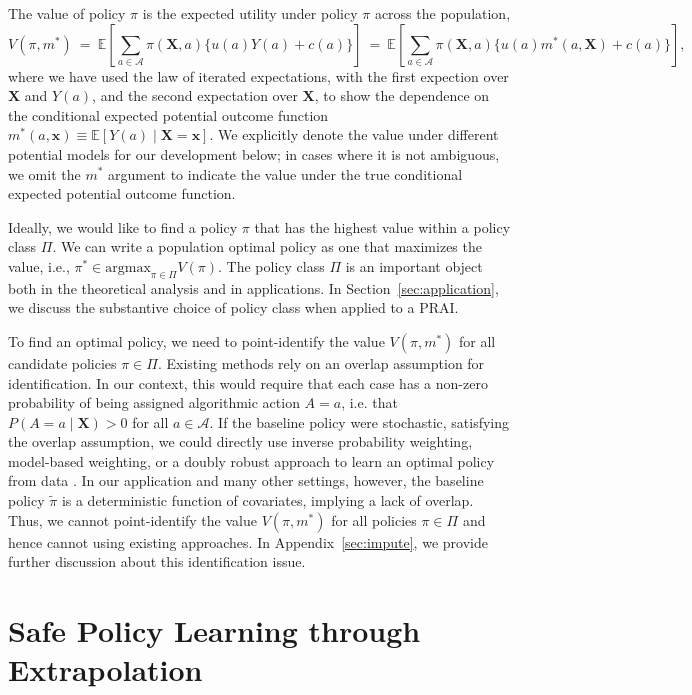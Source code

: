 \documentclass[12pt]{article}
\theoremstyle{definition}
\newcommand{\E}{\ensuremath{\mathbb{E}}}
\newcommand{\argmax}{\text{argmax}}
\newcommand{\bX}{\bm X}
\newcommand{\bx}{\bm x}
\newcommand{\<}{\langle}
\renewcommand{\>}{\rangle}
\begin{document}
The value of policy $\pi$ is the expected utility under policy $\pi$
across the population,
\begin{equation}
  \label{eq:policy_model}
  V(\pi, m^\ast) \ = \ \E\left[\sum_{a \in \mathcal{A}}\pi(\bX, a)
      \{u(a) Y(a) + c(a)\}\right] \ = \ \E\left[\sum_{a \in
      \mathcal{A}} \pi(\bX, a) \{u(a) m^\ast(a, \bX) + c(a)\}\right], 
\end{equation}
where we have used the law of iterated expectations, with the
  first expection over $\bX$ and $Y(a)$, and the second expectation
  over $\bX$, to show the dependence on the conditional expected
potential outcome function
$m^\ast(a,\bx) \equiv \E[Y(a)\mid \bX = \bx] $. We explicitly denote
the value under different potential models for our development below;
in cases where it is not ambiguous, we omit the $m^\ast$ argument to
indicate the value under the true conditional expected potential
outcome function.

Ideally, we would like to find a policy $\pi$ that has the highest
value within a policy class $\Pi$. We can write a population optimal
policy as one that maximizes the value, i.e.,
$\pi^\ast \in \argmax_{\pi \in \Pi} V(\pi)$.
The policy class $\Pi$ is an important object both in the theoretical
analysis and in applications.  In Section~\ref{sec:application}, we
discuss the substantive choice of policy class when applied to a PRAI.


To find an optimal policy, we need to point-identify the value
$V(\pi, m^\ast)$ for all candidate policies $\pi \in \Pi$.  Existing
methods rely on an overlap assumption for identification. In our
context, this would require that each case has a non-zero
probability of being assigned algorithmic action $A=a$, i.e. that
$P(A = a \mid \bX) > 0$ for all $a \in \mathcal{A}$. If the baseline
policy were stochastic, satisfying the overlap assumption, we could
directly use inverse probability weighting, model-based weighting,
or a doubly robust approach to learn an optimal policy from data
\citep[e.g.][]{Qian2011,Zhao2012,Kitagawa2018,Dudik2011, Athey2021}.
In our application and many
other settings, however, the baseline policy $\tilde{\pi}$ is a
deterministic function of covariates, implying a lack of overlap.
Thus, we cannot point-identify the value $V(\pi, m^\ast)$ for all
policies $\pi \in \Pi$ and hence cannot using existing approaches.
In Appendix~\ref{sec:impute}, we provide further discussion about
this identification issue.  

\section{Safe Policy Learning through Extrapolation}
\label{sec:safe_policy}
\end{document}
